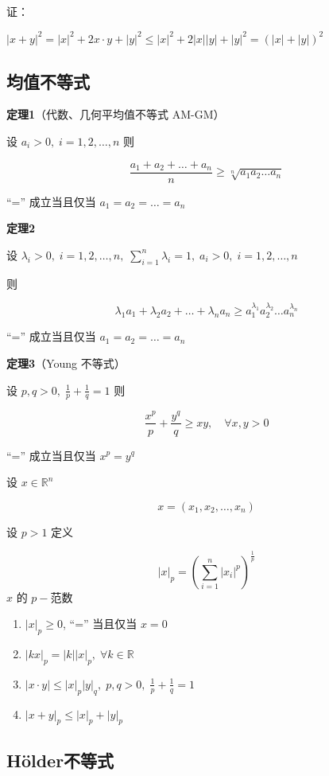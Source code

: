 证：

\(|x+y|^{2}=|x|^{2}+2x\cdot y+|y|^{2} \leq |x|^{2}+2|x| |y|+|y|^{2}=(|x|+|y|)^{2}\)

\subsection{均值不等式}\label{ux5747ux503cux4e0dux7b49ux5f0f}

\textbf{定理1}（代数、几何平均值不等式 AM-GM）

设 \(a_{i}>0, \; i = 1,2, \dots , n\) 则

\[
\frac{a_{1}+a_{2}+\dots+a_{n}}{n}\geq \sqrt[n]{ a_{1}a_{2}\dots a_{n} }
\]

``='' 成立当且仅当 \(a_{1}=a_{2}=\dots =a_{n}\)

\textbf{定理2}

设
\(\lambda_{i}>0, \; i =1,2,\dots,n, \; \sum_{i=1}^n \lambda_{i}=1, \; a_{i}>0, \; i=1,2,\dots,n\)

则

\[
\lambda_{1}a_{1}+\lambda_{2}a_{2}+\dots+\lambda_{n}a_{n}\geq a_{1}^{\lambda_{1}}a_{2}^{\lambda_{2}}\dots a_{n}^{\lambda_{n}}
\]

``='' 成立当且仅当 \(a_{1}=a_{2}=\dots=a_{n}\)

\textbf{定理3}（Young 不等式）

设 \(p, q>0, \; \frac{1}{p}+\frac{1}{q}=1\) 则

\[
\frac{x^p}{p}+\frac{y^{q}}{q}\geq xy,\quad \forall x, y>0
\]

``='' 成立当且仅当 \(x^{p}=y^{q}\)

设 \(x \in \mathbb{R}^n\)

\[
x = (x_{1},x_{2}, \dots , x_{n})
\]

设 \(p>1\) 定义

\[
|x|_{p}=\left( \sum_{i=1}^n |x_{i}|^{p} \right)^{\frac 1p}
\] \(x\) 的 \(p-\)范数

\begin{enumerate}
\def\labelenumi{\arabic{enumi}.}
\tightlist
\item
  \(|x|_{p}\geq 0\), ``='' 当且仅当 \(x=0\)
\item
  \(|kx|_{p}=|k||x|_{p}, \; \forall k \in \mathbb{R}\)
\item
  \(|x\cdot y|\leq|x|_{p}|y|_{q}, \; p,q > 0, \; \frac{1}{p}+\frac{1}{q}=1\)
\item
  \(|x+y|_{p}\leq |x|_{p}+|y|_{p}\)
\end{enumerate}

\subsection{Hölder不等式}\label{huxf6lderux4e0dux7b49ux5f0f}


